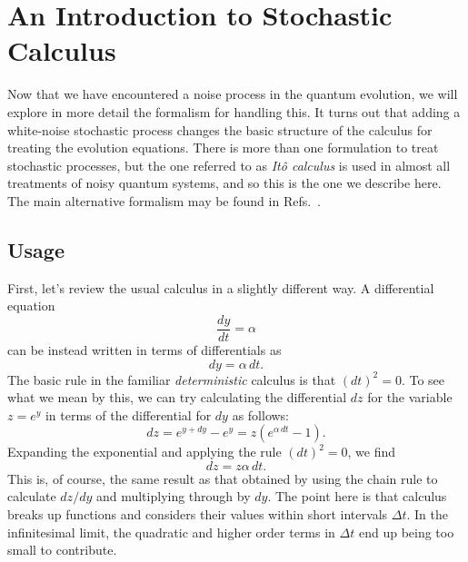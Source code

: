 \documentclass[12pt,aps,onecolum,superscriptaddress,footinbib,floatfix,showpacs]{revtex4-1}
\begin{document}
\section{An Introduction to Stochastic Calculus}
\label{section:Ito}

Now that we have encountered a noise process in the quantum evolution,
we will explore in more detail the formalism for handling this.
It turns out that adding a white-noise stochastic process changes the
basic structure of the calculus for treating the evolution equations.
There is more than one formulation 
to treat stochastic 
processes, but the one referred to as \textit{It\^o calculus} is used in almost 
all treatments of noisy quantum systems, and so this is the one we describe 
here. The main alternative formalism may be found in
Refs.~\cite{gardiner,Kloeden92}.

\subsection{Usage}

First, let's review the usual calculus in a slightly different way.
A differential equation
\begin{equation}
  \frac{dy}{dt} = \alpha
\end{equation}
can be instead written in terms of differentials as
\begin{equation}
   dy= \alpha\,dt.
\end{equation}
The basic rule in the familiar \textit{deterministic} calculus is that $(dt)^2=0$.
To see what we mean by this, we can try calculating the differential $dz$ for 
the variable $z=e^y$ in terms of the differential for $dy$  as follows:
\begin{equation}
  dz = e^{y+dy}-e^y = z\left(e^{\alpha\,dt}-1\right).
\end{equation}
Expanding the exponential and applying the rule $(dt)^2=0$,
we find
\begin{equation}
  dz = z\alpha\,dt.
\end{equation}
This is, of course, the same result as that obtained by using the chain rule 
to calculate $dz/dy$ and multiplying through by $dy$.
The point here is that calculus breaks up functions and considers
their values within short intervals $\Delta t$.  In the infinitesimal
limit, the quadratic and higher order terms in $\Delta t$ end up being
too small to contribute.
\end{document}
